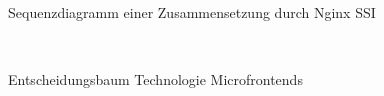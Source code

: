 \begin{figure}[hbt!]
	\centering
	\begin{minipage}[t]{0.75\textwidth}	
		\caption{Sequenzdiagramm einer Zusammensetzung durch Nginx SSI}
		\\ %
		\label{fig:SSCNginxSSI}
	\end{minipage}
\end{figure}

\newpage
\begin{figure}[hbt!]
	\centering
	\begin{minipage}[t]{1\textwidth}	
		\caption{Entscheidungsbaum Technologie Microfrontends}
		\\ %
		\label{fig:EntscheidungsbaumArchitekturMF}
	\end{minipage}
\end{figure}

